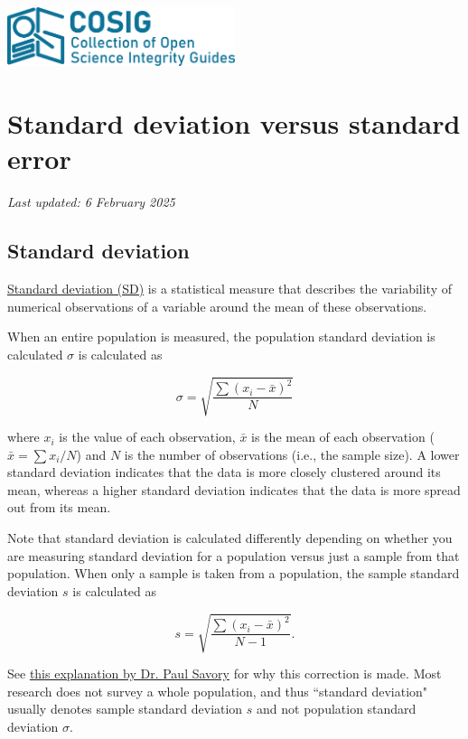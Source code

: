 \documentclass[letterpaper, 12pt]{article}
\begin{document}
\flushleft
\includegraphics[width=0.5\textwidth]{img/home/241017_final_logo_mockup.png}

\section*{Standard deviation versus standard error}
\textit{Last updated: 6 February 2025}

\subsection*{Standard deviation}

\href{https://en.wikipedia.org/wiki/Standard_deviation}{Standard deviation (SD)} is a statistical measure that describes the variability of numerical observations of a variable around the mean of these observations.

When an entire population is measured, the population standard deviation is calculated $\sigma$ is calculated as 

$$
\sigma = \sqrt{\frac{\sum(x_i - \bar{x})^2}{N}}
$$

where $x_i$ is the value of each observation, $\bar{x}$ is the mean of each observation ($\bar{x} = \sum x_i / N$) and $N$ is the number of observations (i.e., the sample size). A lower standard deviation indicates that the data is more closely clustered around its mean, whereas a higher standard deviation indicates that the data is more spread out from its mean.

Note that standard deviation is calculated differently depending on whether you are measuring standard deviation for a population versus just a sample from that population. When only a sample is taken from a population, the sample standard deviation $s$ is calculated as 

$$
s = \sqrt{\frac{\sum(x_i - \bar{x})^2}{N-1}}.
$$

See \href{https://digitalcommons.unl.edu/cgi/viewcontent.cgi?article=1008&context=imseteach}{this explanation by Dr. Paul Savory} for why this correction is made. Most research does not survey a whole population, and thus ``standard deviation" usually denotes sample standard deviation $s$ and not population standard deviation $\sigma$.
\end{document}
